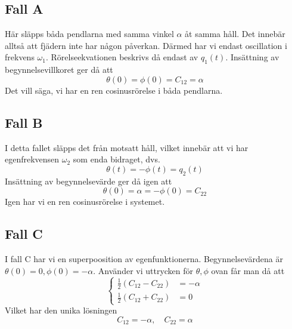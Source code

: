 \subsection{Fall A}
Här släpps båda pendlarna med samma vinkel $\alpha$ åt samma håll. Det innebär alltså att fjädern inte har någon påverkan. Därmed har vi endast oscillation i frekvens $\omega_1$. Rörelseekvationen beskrivs då endast av $q_1(t)$. Insättning av begynnelsevillkoret ger då att \begin{equation}
    \theta(0)=\phi(0) = C_{12} = \alpha
\end{equation}
Det vill säga, vi har en ren cosinusrörelse i båda pendlarna.

\subsection{Fall B}
I detta fallet släpps det från motsatt håll, vilket innebär att vi har egenfrekvensen $\omega_2$ som enda bidraget, dvs. \begin{equation}
    \theta(t)=-\phi(t) = q_2(t)
\end{equation}
Insättning av begynnelsevärde ger då igen att \begin{equation}
    \theta(0)=\alpha=-\phi(0) = C_{22}
\end{equation}
Igen har vi en ren cosinusrörelse i systemet.

\subsection{Fall C}
I fall C har vi en superpoosition av egenfunktionerna. Begynnelsevärdena är $\theta(0)=0, \phi(0)=-\alpha$. Använder vi uttrycken för $\theta,\phi$ ovan får man då att \begin{equation}
    \begin{cases}
        \frac{1}{2}(C_{12}-C_{22})&=-\alpha\\
        \frac{1}{2}(C_{12}+C_{22})&=0
    \end{cases}
\end{equation}
Vilket har den unika lösningen \begin{equation}
    C_{12} = -\alpha, \quad C_{22} = \alpha
\end{equation}
